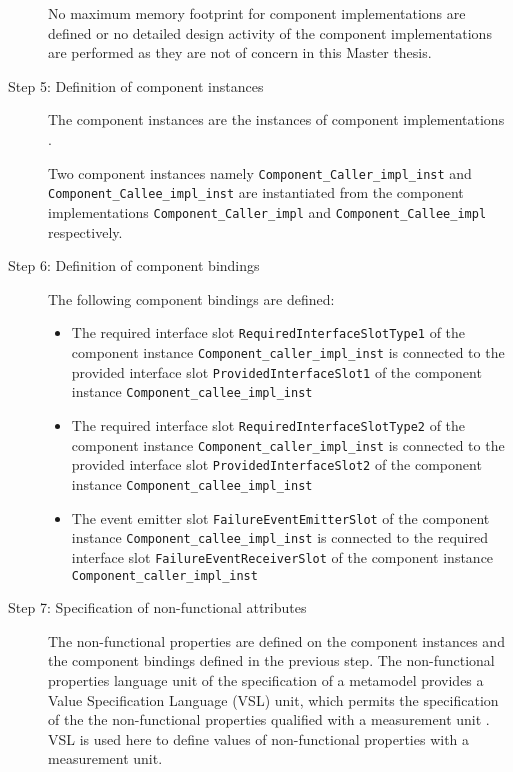 \begin{description}
No maximum memory footprint for component implementations are defined or no detailed design activity of the component implementations are performed as they are not of concern in this Master thesis.

\item [Step 5: Definition of component instances] The component instances are the instances of component implementations \cite{CompBasedProcess}.

Two component instances namely \texttt{Component\allowbreak\_Caller\_impl\_inst} and \texttt{Component\allowbreak\_Callee\_impl\_inst} are instantiated from the component implementations \texttt{Component\allowbreak\_Caller\_impl} and \texttt{Component\allowbreak\_Callee\_impl} respectively. 

\item [Step 6: Definition of component bindings] The following component bindings are defined:

\begin{itemize}
\item The required interface slot \texttt{RequiredInterface\allowbreak SlotType1} of the component instance \texttt{Component\allowbreak\_caller\_impl\_inst} is connected to the provided interface slot \texttt{ProvidedInterface\allowbreak Slot1} of the component instance \texttt{Component\allowbreak\_callee\_impl\_inst}
\item The required interface slot \texttt{RequiredInterface\allowbreak SlotType2} of the component instance \texttt{Component\allowbreak\_caller\_impl\_inst} is connected to the provided interface slot \texttt{ProvidedInterface\allowbreak Slot2} of the component instance \texttt{Component\allowbreak\_callee\_impl\_inst}
\item The event emitter slot \texttt{FailureEvent\allowbreak EmitterSlot} of the component instance \texttt{Component\allowbreak\_callee\_impl\_inst} is connected to the required interface slot \texttt{FailureEvent\allowbreak ReceiverSlot} of the component instance \texttt{Component\allowbreak\_caller\_impl\_inst}
\end{itemize}

\item [Step 7: Specification of non-functional attributes] The non-functional properties are defined on the component instances and the component bindings defined in the previous step. The non-functional properties language unit of the specification of a metamodel provides a Value Specification Language (VSL) unit, which permits the specification of the the non-functional properties qualified with a measurement unit \cite{SpecMetamodel}. VSL is used here to define values of non-functional properties with a measurement unit. 


\end{description}

